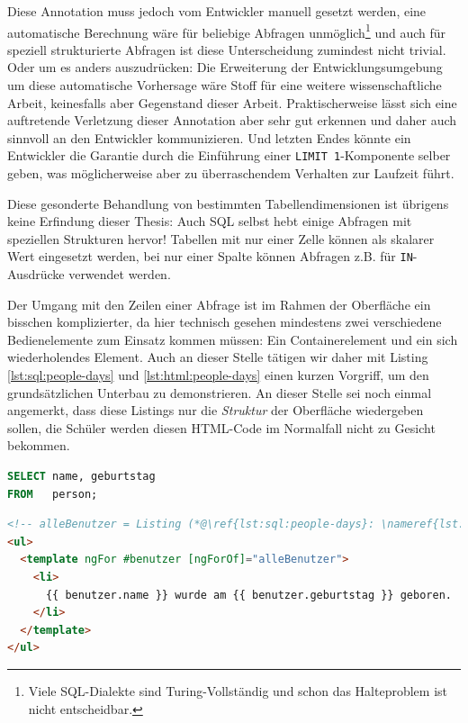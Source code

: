 Diese Annotation muss jedoch vom Entwickler manuell gesetzt werden, eine automatische Berechnung wäre für beliebige Abfragen unmöglich\footnote{Viele SQL-Dialekte sind Turing-Vollständig und schon das Halteproblem ist nicht entscheidbar.} und auch für speziell strukturierte Abfragen ist diese Unterscheidung zumindest nicht trivial. Oder um es anders auszudrücken: Die Erweiterung der Entwicklungsumgebung um diese automatische Vorhersage wäre Stoff für eine weitere wissenschaftliche Arbeit, keinesfalls aber Gegenstand dieser Arbeit. Praktischerweise lässt sich eine auftretende Verletzung dieser Annotation aber sehr gut erkennen und daher auch sinnvoll an den Entwickler kommunizieren. Und letzten Endes könnte ein Entwickler die Garantie durch die Einführung einer \texttt{LIMIT 1}-Komponente selber geben, was möglicherweise aber zu überraschendem Verhalten zur Laufzeit führt.

Diese gesonderte Behandlung von bestimmten Tabellendimensionen ist übrigens keine Erfindung dieser Thesis: Auch SQL selbst hebt einige Abfragen mit speziellen Strukturen hervor! Tabellen mit nur einer Zelle können als skalarer Wert eingesetzt werden, bei nur einer Spalte können Abfragen z.B. für \texttt{IN}-Ausdrücke verwendet werden.

Der Umgang mit den Zeilen einer Abfrage ist im Rahmen der Oberfläche ein bisschen komplizierter, da hier technisch gesehen mindestens zwei verschiedene Bedienelemente zum Einsatz kommen müssen: Ein Containerelement und ein sich wiederholendes Element. Auch an dieser Stelle tätigen wir daher mit Listing \ref{lst:sql:people-days} und \ref{lst:html:people-days} einen kurzen Vorgriff, um den grundsätzlichen Unterbau zu demonstrieren. An dieser Stelle sei noch einmal angemerkt, dass diese Listings nur die \textit{Struktur} der Oberfläche wiedergeben sollen, die Schüler werden diesen HTML-Code im Normalfall nicht zu Gesicht bekommen.

\begin{lstlisting}[language=SQL, caption=Abfrage mit beliebig vielen Ergebniszeilen,label=lst:sql:people-days]
SELECT name, geburtstag
FROM   person;
\end{lstlisting}

\begin{lstlisting}[language=HTML, caption=Containerelemente mit Kindern, label=lst:html:people-days]
<!-- alleBenutzer = Listing (*@\ref{lst:sql:people-days}: \nameref{lst:sql:people-days}@*) -->
<ul>
  <template ngFor #benutzer [ngForOf]="alleBenutzer">
    <li>
      {{ benutzer.name }} wurde am {{ benutzer.geburtstag }} geboren.
    </li>
  </template>
</ul>
\end{lstlisting}


